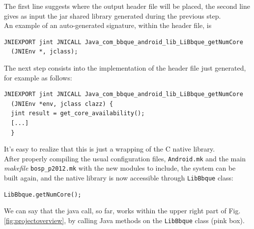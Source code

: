 The first line suggests where the output header file will be placed, the second line gives as input the jar shared library generated during the previous step.\\
An example of an auto-generated signature, within the header file, is
\begin{verbatim}
JNIEXPORT jint JNICALL Java_com_bbque_android_lib_LiBbque_getNumCore
  (JNIEnv *, jclass);
\end{verbatim}
The next step consists into the implementation of the header file just generated, for example as follows:
\begin{verbatim}
JNIEXPORT jint JNICALL Java_com_bbque_android_lib_LiBbque_getNumCore
  (JNIEnv *env, jclass clazz) {
  jint result = get_core_availability();
  [...]
  }
\end{verbatim}
It's easy to realize that this is just a wrapping of the C native library.\\
After properly compiling the usual configuration files, \texttt{Android.mk} and the main \textit{makefile} \texttt{bosp\_p2012.mk} with the new modules to include, the system can be built again, and the native library is now accessible through \texttt{LibBbque} class:
\begin{verbatim}
LibBbque.getNumCore();
\end{verbatim}
We can say that the java call, so far, works within the upper right part of Fig. \ref{fig:projectoverview}, by calling Java methods on the \texttt{LibBbque} class (pink box).
